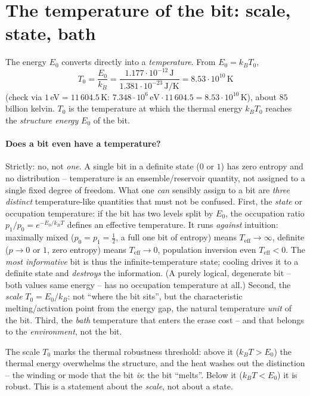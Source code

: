 \section{The temperature of the bit: scale, state, bath}
The energy $E_0$ converts directly into a \emph{temperature}. From $E_0=k_B T_0$,
\[
T_0=\frac{E_0}{k_B}=\frac{1.177\cdot10^{-12}\,\text{J}}{1.381\cdot10^{-23}\,\text{J/K}}
   =8.53\cdot10^{10}\,\text{K}
\]
(check via $1$\,eV$=11\,604.5$\,K: $7.348\cdot10^6\,\text{eV}\cdot11\,604.5=8.53\cdot10^{10}$\,K), about
$85$ billion kelvin. $T_0$ is the temperature at which the thermal energy $k_B T_0$ reaches the
\emph{structure energy} $E_0$ of the bit.

\paragraph{Does a bit even have a temperature?} Strictly: no, not \emph{one}. A single bit in a definite
state ($0$ or $1$) has zero entropy and no distribution -- temperature is an ensemble/reservoir quantity,
not assigned to a single fixed degree of freedom. What one \emph{can} sensibly assign to a bit are
\emph{three distinct} temperature-like quantities that must not be confused. First, the \emph{state} or
occupation temperature: if the bit has two levels split by $E_0$, the occupation ratio
$p_1/p_0=e^{-E_0/k_B T}$ defines an effective temperature. It runs \emph{against} intuition: maximally
mixed ($p_0=p_1=\tfrac12$, a full one bit of entropy) means $T_\text{eff}\to\infty$, definite ($p\to0$ or
$1$, zero entropy) means $T_\text{eff}\to0$, population inversion even $T_\text{eff}<0$. The
\emph{most informative} bit is thus the infinite-temperature state; cooling drives it to a definite state
and \emph{destroys} the information. (A purely logical, degenerate bit -- both values same energy -- has
no occupation temperature at all.) Second, the \emph{scale} $T_0=E_0/k_B$: not \enquote{where the bit
sits}, but the characteristic melting/activation point from the energy gap, the natural temperature
\emph{unit} of the bit. Third, the \emph{bath} temperature that enters the erase cost -- and that belongs
to the \emph{environment}, not the bit.

The scale $T_0$ marks the thermal robustness threshold: above it ($k_B T>E_0$) the thermal energy
overwhelms the structure, and the heat washes out the distinction -- the winding or mode that the bit
\emph{is}: the bit \enquote{melts}. Below it ($k_B T<E_0$) it is robust. This is a statement about the
\emph{scale}, not about a state.

